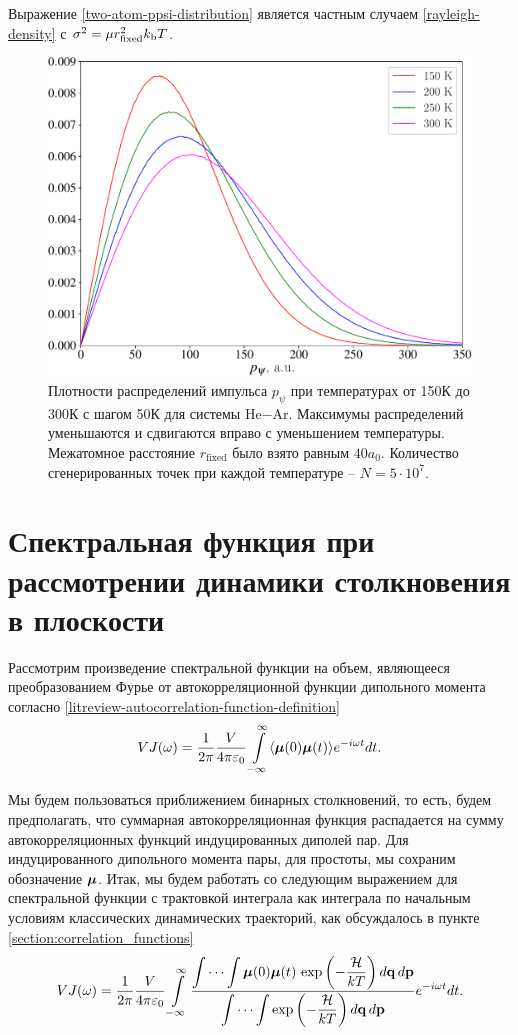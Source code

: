 Выражение \eqref{two-atom-ppsi-distribution} является частным случаем \eqref{rayleigh-density} с $\sigma^2 = \mu r_\text{fixed}^2 k_\text{b} T$.

\begin{figure}[H]
    \centering
    \includegraphics[width=0.75\linewidth]{./pictures/two_atom_distributions/pPsi-crop.pdf}
    \caption{Плотности распределений импульса $p_\psi$ при температурах от 150К до 300К с шагом 50К для системы He$-$Ar. Максимумы распределений уменьшаются и сдвигаются вправо с уменьшением температуры. Межатомное расстояние $r_\text{fixed}$ было взято равным $40a_0$. Количество сгенерированных точек при каждой температуре -- $N = 5 \cdot 10^7$.}
\end{figure}

\section{Спектральная функция при рассмотрении динамики столкновения в плоскости} \label{section:spectral_function_in_plane}

Рассмотрим произведение спектральной функции на объем, являющееся преобразованием Фурье от автокорреляционной функции дипольного момента согласно \eqref{litreview-autocorrelation-function-definition}   
\begin{gather}
    VJ(\omega) = \frac{1}{2 \pi} \frac{V}{4 \pi \varepsilon_0} \int\limits_{-\infty}^\infty \langle  \boldsymbol{\mu}(0) \boldsymbol{\mu}(t)  \rangle e^{-i \omega t} dt.
\end{gather}

Мы будем пользоваться приближением бинарных столкновений, то есть, будем предполагать, что суммарная автокорреляционная функция распадается на сумму автокорреляционных функций индуцированных диполей пар. Для индуцированного дипольного момента пары, для простоты, мы сохраним обозначение $\boldsymbol{\mu}$. Итак, мы будем работать со следующим выражением для спектральной функции с трактовкой интеграла как интеграла по начальным условиям классических динамических траекторий, как обсуждалось в пункте \ref{section:correlation_functions} 
\begin{gather}
    VJ(\omega) = \frac{1}{2\pi} \frac{V}{4 \pi \varepsilon_0} \int\limits_{-\infty}^\infty \frac{\displaystyle \idotsint \boldsymbol{\mu}(0) \boldsymbol{\mu}(t) \, \exp \left( -\frac{\mathcal{H}}{kT} \right) d\mathbf{q} \, d\mathbf{p}}{\displaystyle \idotsint \exp \left( -\frac{\mathcal{H}}{kT} \right) d\mathbf{q} \, d\mathbf{p}} e^{-i \omega t} dt. \label{two-atom-spectral-function1}
\end{gather}

